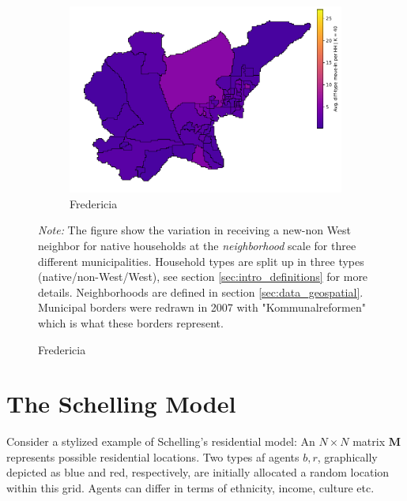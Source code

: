 \documentclass[../main.tex]{subfiles}
\begin{document}
\begin{landscape}
\begin{figure}
	\begin{subfigure}{.55\textwidth}	
	\centering
	\includegraphics[width=\textwidth]{figs/fredericia_howdy_neighbor.pdf}	
	\caption{Fredericia} \label{fig:incidence_different_type_fredericia_appendix}
	\end{subfigure}	
\begin{tablenotes}
\item \footnotesize \textit{Note:} The figure show the variation in receiving a new-non West neighbor for native households at the \textit{neighborhood} scale for three different municipalities. Household types are split up in three types (native/non-West/West), see section \ref{sec:intro_definitions} for more details. Neighborhoods are defined in section \ref{sec:data_geospatial}. Municipal borders were redrawn in 2007 with "Kommunalreformen" which is what these borders represent.
\end{tablenotes}
\label{fig:incidence_new_non_west_neighbors_appendix}
\end{figure}
\end{landscape}

\section{The Schelling Model}

\label{sec:appendix_schelling}

Consider a stylized example of Schelling's residential model: 
An $N \times N$ matrix $\textbf{M}$ represents possible residential locations. Two types af agents $b, r$, graphically depicted as blue and red, respectively, are initially allocated a random location within this grid. Agents can differ in terms of ethnicity, income, culture etc. 
\end{document}
